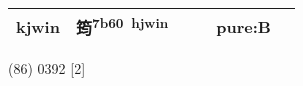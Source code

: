 \documentclass[14pt,a4paper]{scrartcl}
\begin{document}
\begin{longtable}[c]{@{}llllll@{}}
\begin{minipage}[t]{0.14\columnwidth}
kjwin
\strut\end{minipage} &
\begin{minipage}[t]{0.14\columnwidth}\raggedright\strut
筠\textsuperscript{7b60~hjwin}
\strut\end{minipage} &
\begin{minipage}[t]{0.14\columnwidth}\raggedright\strut
\strut\end{minipage} &
\begin{minipage}[t]{0.14\columnwidth}\raggedright\strut
\strut\end{minipage} &
\begin{minipage}[t]{0.14\columnwidth}\raggedright\strut
pure:B
\strut\end{minipage}\tabularnewline
\bottomrule
\end{longtable}

(86) 0392 {[}2{]}
\end{document}
